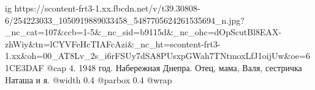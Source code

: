  
 
 
 
 

\ifcmt
  ig https://scontent-frt3-1.xx.fbcdn.net/v/t39.30808-6/254223033_1050919889033458_5487705624261535694_n.jpg?_nc_cat=107&ccb=1-5&_nc_sid=b9115d&_nc_ohc=dOpScutBl8EAX-zhWiy&tn=lCYVFeHcTIAFcAzi&_nc_ht=scontent-frt3-1.xx&oh=00_AT8Lv_2s_i6rFSUy7dSA8PUsxpGWah7TNtmoxLfJ1oijUw&oe=61CE3DAF
  @cap 4. 1948 год. Набережная Днепра. Отец, мама, Валя, сестричка Hаташа и я. 
  @width 0.4
  @parbox 0.4
  @wrap \parpic[l]
\fi
